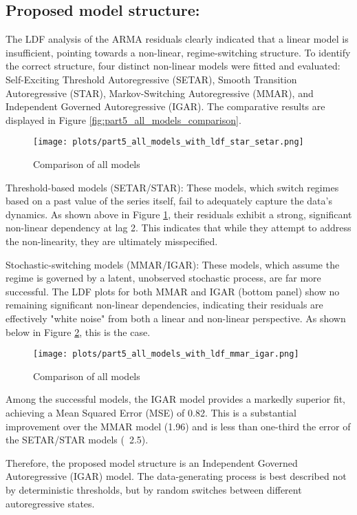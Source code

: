 \documentclass{article}
\begin{document}
\subsection{Proposed model structure:}

The LDF analysis of the ARMA residuals clearly indicated that a linear model is insufficient, pointing towards a non-linear, regime-switching structure. To identify the correct structure, four distinct non-linear models were fitted and evaluated: Self-Exciting Threshold Autoregressive (SETAR), Smooth Transition Autoregressive (STAR), Markov-Switching Autoregressive (MMAR), and Independent Governed Autoregressive (IGAR). The comparative results are displayed in Figure \ref{fig:part5_all_models_comparison}.

\begin{figure}[H]
    \centering
    \texttt{[image: plots/part5\_all\_models\_with\_ldf\_star\_setar.png]}
    \caption{Comparison of all models}
    \label{fig:part5_all_models_with_ldf_star_setar}
\end{figure}

Threshold-based models (SETAR/STAR): These models, which switch regimes based on a past value of the series itself, fail to adequately capture the data's dynamics. As shown above in Figure \ref{fig:part5_all_models_with_ldf_star_setar}, their residuals exhibit a strong, significant non-linear dependency at lag 2. This indicates that while they attempt to address the non-linearity, they are ultimately misspecified.

Stochastic-switching models (MMAR/IGAR): These models, which assume the regime is governed by a latent, unobserved stochastic process, are far more successful. The LDF plots for both MMAR and IGAR (bottom panel) show no remaining significant non-linear dependencies, indicating their residuals are effectively "white noise" from both a linear and non-linear perspective. As shown below in Figure \ref{fig:part5_all_models_with_ldf_mmar_igar}, this is the case.

\begin{figure}[H]
    \centering
    \texttt{[image: plots/part5\_all\_models\_with\_ldf\_mmar\_igar.png]}
    \caption{Comparison of all models}
    \label{fig:part5_all_models_with_ldf_mmar_igar}
\end{figure}

Among the successful models, the IGAR model provides a markedly superior fit, achieving a Mean Squared Error (MSE) of 0.82. This is a substantial improvement over the MMAR model (1.96) and is less than one-third the error of the SETAR/STAR models (~2.5).

Therefore, the proposed model structure is an Independent Governed Autoregressive (IGAR) model. The data-generating process is best described not by deterministic thresholds, but by random switches between different autoregressive states.




\end{document}
